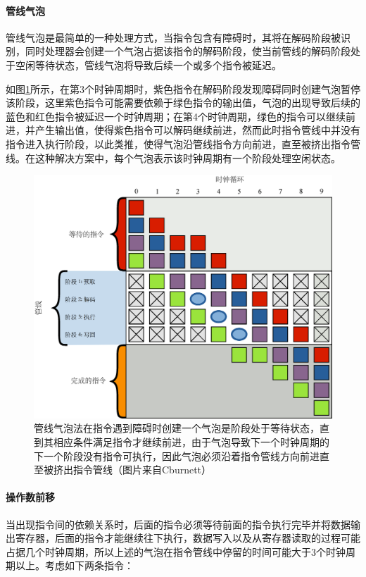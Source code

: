 \paragraph{管线气泡}
管线气泡是最简单的一种处理方式，当指令包含有障碍时，其将在解码阶段被识别，同时处理器会创建一个气泡占据该指令的解码阶段，使当前管线的解码阶段处于空闲等待状态，管线气泡将导致后续一个或多个指令被延迟。

如图\ref{f:rp-pipeline-bubble}所示，在第3个时钟周期时，紫色指令在解码阶段发现障碍同时创建气泡暂停该阶段，这里紫色指令可能需要依赖于绿色指令的输出值，气泡的出现导致后续的蓝色和红色指令被延迟一个时钟周期；在第4个时钟周期，绿色的指令可以继续前进，并产生输出值，使得紫色指令可以解码继续前进，然而此时指令管线中并没有指令进入执行阶段，以此类推，使得气泡沿管线指令方向前进，直至被挤出指令管线。在这种解决方案中，每个气泡表示该时钟周期有一个阶段处理空闲状态。

\begin{figure}
	\includegraphics[width=\textwidth]{figures/rp/Pipeline-bubble}
	\caption{管线气泡法在指令遇到障碍时创建一个气泡是阶段处于等待状态，直到其相应条件满足指令才继续前进，由于气泡导致下一个时钟周期的下一个阶段没有指令可执行，因此气泡必须沿着指令管线方向前进直至被挤出指令管线（图片来自Cburnett）}
	\label{f:rp-pipeline-bubble}
\end{figure}




\paragraph{操作数前移}
当出现指令间的依赖关系时，后面的指令必须等待前面的指令执行完毕并将数据输出寄存器，后面的指令才能继续往下执行，数据写入以及从寄存器读取的过程可能占据几个时钟周期，所以上述的气泡在指令管线中停留的时间可能大于3个时钟周期以上。考虑如下两条指令：

